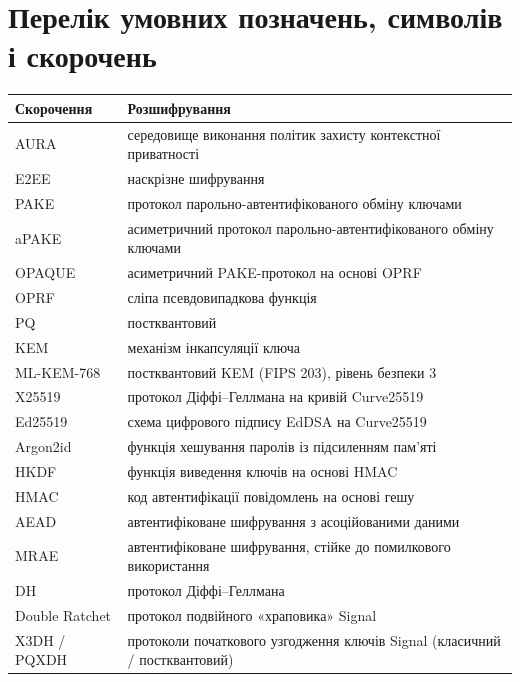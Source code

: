 
\chapter*{Перелік умовних позначень, символів і скорочень}

\begin{longtable}{p{3.2cm} p{11.5cm}}
\textbf{Скорочення} & \textbf{Розшифрування} \\
\midrule
\endhead
AURA & середовище виконання політик захисту контекстної приватності \\
E2EE & наскрізне шифрування \\
PAKE & протокол парольно-автентифікованого обміну ключами \\
aPAKE & асиметричний протокол парольно-автентифікованого обміну ключами \\
OPAQUE & асиметричний PAKE-протокол на основі OPRF \\
OPRF & сліпа псевдовипадкова функція \\
PQ & постквантовий \\
KEM & механізм інкапсуляції ключа \\
ML-KEM-768 & постквантовий KEM (FIPS 203), рівень безпеки 3 \\
X25519 & протокол Діффі--Геллмана на кривій Curve25519 \\
Ed25519 & схема цифрового підпису EdDSA на Curve25519 \\
Argon2id & функція хешування паролів із підсиленням пам'яті \\
HKDF & функція виведення ключів на основі HMAC \\
HMAC & код автентифікації повідомлень на основі гешу \\
AEAD & автентифіковане шифрування з асоційованими даними \\
MRAE & автентифіковане шифрування, стійке до помилкового використання \\
DH & протокол Діффі--Геллмана \\
Double Ratchet & протокол подвійного «храповика» Signal \\
X3DH / PQXDH & протоколи початкового узгодження ключів Signal (класичний / постквантовий) \\

\end{longtable}
